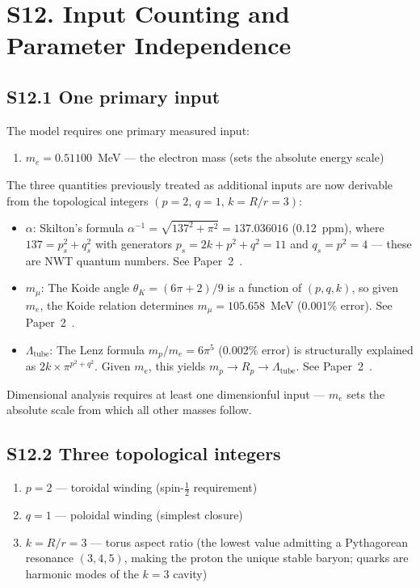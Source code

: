 \documentclass[11pt,a4paper]{article}
\begin{document}
\section{S12. Input Counting and Parameter Independence}
\label{sec:S12}

\subsection{S12.1 One primary input}

The model requires one primary measured input:
\begin{enumerate}
  \item $m_e = 0.51100$~MeV --- the electron mass (sets the absolute energy scale)
\end{enumerate}

The three quantities previously treated as additional inputs are now derivable from the topological integers $(p{=}2,\, q{=}1,\, k{=}R/r{=}3)$:
\begin{itemize}
  \item \textbf{$\alpha$}: Skilton's formula $\alpha^{-1} = \sqrt{137^2 + \pi^2} = 137.036016$ (0.12~ppm), where $137 = p_s^2 + q_s^2$ with generators $p_s = 2k + p^2 + q^2 = 11$ and $q_s = p^2 = 4$ --- these are NWT quantum numbers. See Paper~2~\cite{galasyn2026b}.
  \item \textbf{$m_\mu$}: The Koide angle $\theta_K = (6\pi+2)/9$ is a function of $(p,q,k)$, so given $m_e$, the Koide relation determines $m_\mu = 105.658$~MeV (0.001\% error). See Paper~2~\cite{galasyn2026b}.
  \item \textbf{$\Lambda_{\text{tube}}$}: The Lenz formula $m_p/m_e = 6\pi^5$ (0.002\% error) is structurally explained as $2k \times \pi^{p^2+q^2}$. Given $m_e$, this yields $m_p \to R_p \to \Lambda_{\text{tube}}$. See Paper~2~\cite{galasyn2026b}.
\end{itemize}

Dimensional analysis requires at least one dimensionful input --- $m_e$ sets the absolute scale from which all other masses follow.

\subsection{S12.2 Three topological integers}

\begin{enumerate}
  \item $p = 2$ --- toroidal winding (spin-$\tfrac{1}{2}$ requirement)
  \item $q = 1$ --- poloidal winding (simplest closure)
  \item $k = R/r = 3$ --- torus aspect ratio (the lowest value admitting a Pythagorean resonance $(3,4,5)$, making the proton the unique stable baryon; quarks are harmonic modes of the $k{=}3$ cavity)
\end{enumerate}
\end{document}
